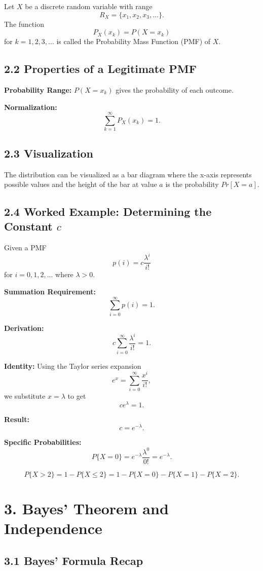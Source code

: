 \documentclass{article}
\begin{document}
Let $X$ be a discrete random variable with range
\[
R_{X}=\{x_{1},x_{2},x_{3},...\}.
\]
The function
\[
P_{X}(x_{k})=P(X=x_{k})
\]
for $k=1,2,3,...$ is called the Probability Mass Function (PMF) of $X$.

\subsection*{2.2 Properties of a Legitimate PMF}

\textbf{Probability Range:} $P(X=x_{k})$ gives the probability of each outcome.

\textbf{Normalization:}
\[
\sum_{k=1}^{\infty}P_{X}(x_{k})=1.
\]

\subsection*{2.3 Visualization}

The distribution can be visualized as a bar diagram where the x-axis represents possible values and the height of the bar at value $a$ is the probability $Pr[X=a]$.

\subsection*{2.4 Worked Example: Determining the Constant $c$}

Given a PMF
\[
p(i)=c\frac{\lambda^{i}}{i!}
\]
for $i=0,1,2,...$ where $\lambda > 0$.

\textbf{Summation Requirement:}
\[
\sum_{i=0}^{\infty}p(i)=1.
\]

\textbf{Derivation:}
\[
c\sum_{i=0}^{\infty}\frac{\lambda^{i}}{i!}=1.
\]

\textbf{Identity:} Using the Taylor series expansion
\[
e^{x}=\sum_{i=0}^{\infty}\frac{x^{i}}{i!},
\]
we substitute $x=\lambda$ to get
\[
ce^{\lambda}=1.
\]

\textbf{Result:}
\[
c=e^{-\lambda}.
\]

\textbf{Specific Probabilities:}
\[
P\{X=0\}=e^{-\lambda}\frac{\lambda^{0}}{0!}=e^{-\lambda}.
\]

\[
P\{X>2\}=1-P\{X\le2\}=1-P\{X=0\}-P\{X=1\}-P\{X=2\}.
\]

\section*{3. Bayes' Theorem and Independence}

\subsection*{3.1 Bayes' Formula Recap}
\end{document}
